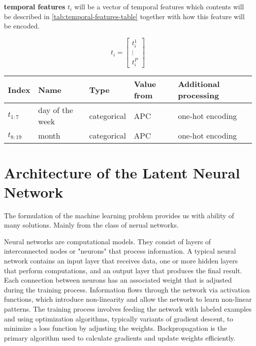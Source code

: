\textbf{temporal features} $t_i$ will be a vector of temporal features which contents will be described in \ref{tab:temporal-features-table} together with how this feature will be encoded.

\begin{equation}
    t_i = \begin{bmatrix}
        t_i^1  \\
        \vdots \\
        t_i^P
    \end{bmatrix}
\end{equation}

\begin{table*}[h!]
    \caption{Overview of temporal pattern used in feature vector.}
    \label{tab:temporal-features-table}
    \begin{tabular}{p{1cm} p{3.5cm} p{1.8cm} p{3.5cm} p{4.5cm}}
        \toprule
        \textbf{Index} & \textbf{Name}   & \textbf{Type} & \textbf{Value from} & \textbf{Additional processing} \\
        \midrule
        $t_{1:7}$      & day of the week & categorical   & \acrfull{APC}       & one-hot encoding               \\
        $t_{8:19}$     & month           & categorical   & \acrfull{APC}       & one-hot encoding               \\
        \bottomrule
    \end{tabular}
\end{table*}

\section{Architecture of the Latent Neural Network}

The formulation of the machine learning problem provides us with ability of many solutions. Mainly from the class of nerual networks.

Neural networks are computational models. They consist of layers of interconnected nodes or "neurons" that process information. A typical neural network contains an input layer that receives data, one or more hidden layers that perform computations, and an output layer that produces the final result. Each connection between neurons has an associated weight that is adjusted during the training process. Information flows through the network via activation functions, which introduce non-linearity and allow the network to learn non-linear patterns. The training process involves feeding the network with labeled examples and using optimization algorithms, typically variants of gradient descent, to minimize a loss function by adjusting the weights. Backpropagation is the primary algorithm used to calculate gradients and update weights efficiently.


